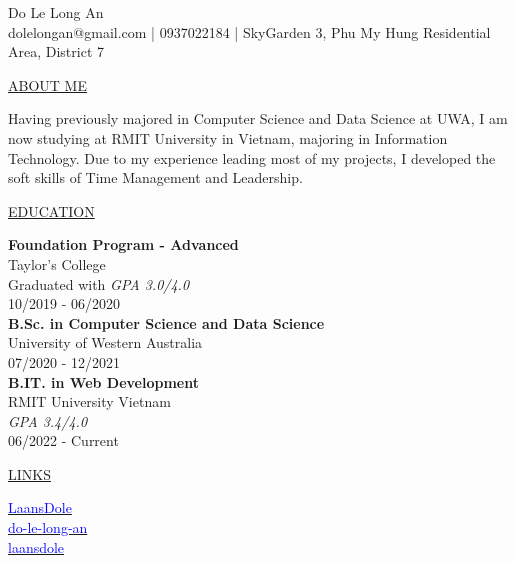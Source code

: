 \documentclass[11pt]{article}
\newcommand{\resumetitle}[3]{
    \AddToShipoutPictureBG{
        \AtPageUpperLeft {
        \raisebox{-0.09\paperheight}{
            \color{black!85}\rule{2\paperwidth}{\paperheight}}
        }}
    \begin{Center}
        \begingroup
        \titlethin
        \color{black!10}\Huge{#1}
        \titlethick
        \color{black!5}\Huge{#2} \\
        \vspace{2mm}
        \textrm{\color{black!15}\Large{#3}}
        \endgroup
    \end{Center}
    \vspace{7mm}
}
\newcommand{\betteruline}[1]{
    \uline{#1}
}
\newcommand{\sectiontitle}[1]{
    \begingroup
        \titlebold
        \betteruline{\Large\uppercase{#1}  }
        \vspace{1.7mm}
    \endgroup
}
\newcommand{\sectioncontent}[1]{
    \begingroup
        \begin{FlushLeft}
        \vspace{-3mm}
        \sffamily\small#1
        \end{FlushLeft}
    \endgroup
    \vspace{2mm}
}
\begin{document}
    \resumetitle{Do}{Le Long An} {
        dolelongan@gmail.com |
        0937022184 |
        SkyGarden 3, Phu My Hung Residential Area, District 7
    }

    \setlength{\columnsep}{7mm}
    \begin{paracol}{2}

    \sectiontitle{about me}
    \sectioncontent{
        Having previously majored in Computer Science and Data Science at UWA, I am now studying at RMIT University in Vietnam, majoring in Information Technology. Due to my experience leading most of my projects, I developed the soft skills of Time Management and Leadership.
    }

    \sectiontitle{education}
    \sectioncontent{
        \textbf{Foundation Program - Advanced} \\
        Taylor's College \\
        Graduated with \textit{GPA 3.0/4.0} \\
        \textcolor{black!70}{10/2019 - 06/2020} \\
        \vspace{2mm}
        \textbf{B.Sc. in Computer Science and Data Science} \\
        University of Western Australia \\
        \textcolor{black!70}{07/2020 - 12/2021} \\
         \vspace{2mm}
        \textbf{B.IT. in Web Development} \\
        RMIT University Vietnam \\
        \textit{GPA 3.4/4.0} \\
        \textcolor{black!70}{06/2022 - Current} \\
    }

    \sectiontitle{links}
    \sectioncontent{
        \hspace{3mm}
        \href{https://github.com/LaansDole}{\textcolor{blue}{LaansDole}} \\
        \vspace{2mm}
        \faIcon{linkedin-in}\hspace{3mm}
        \href{https://www.linkedin.com/in/do-le-long-an/}{\textcolor{blue}{do-le-long-an}} \\
        \vspace{2mm}
        \faIcon{facebook}\hspace{3mm}
        \href{https://www.facebook.com/laansdole/}{\textcolor{blue}{laansdole}}
    }


\end{paracol}
\end{document}
